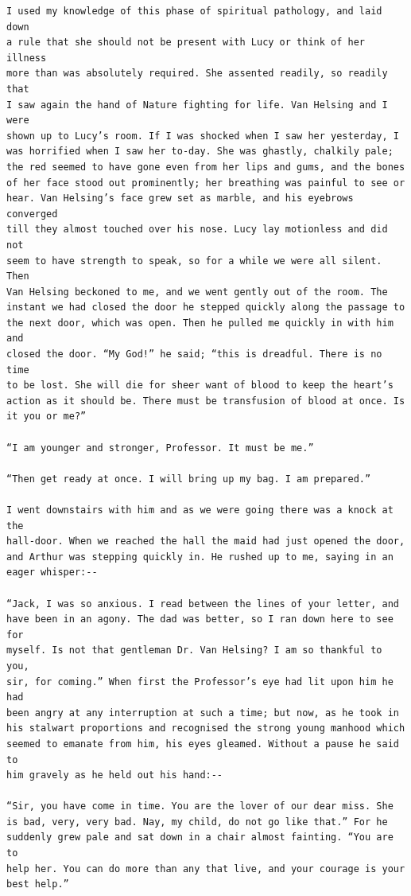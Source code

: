 \documentclass{article}
\begin{document}
\begin{verbatim}
I used my knowledge of this phase of spiritual pathology, and laid down
a rule that she should not be present with Lucy or think of her illness
more than was absolutely required. She assented readily, so readily that
I saw again the hand of Nature fighting for life. Van Helsing and I were
shown up to Lucy’s room. If I was shocked when I saw her yesterday, I
was horrified when I saw her to-day. She was ghastly, chalkily pale;
the red seemed to have gone even from her lips and gums, and the bones
of her face stood out prominently; her breathing was painful to see or
hear. Van Helsing’s face grew set as marble, and his eyebrows converged
till they almost touched over his nose. Lucy lay motionless and did not
seem to have strength to speak, so for a while we were all silent. Then
Van Helsing beckoned to me, and we went gently out of the room. The
instant we had closed the door he stepped quickly along the passage to
the next door, which was open. Then he pulled me quickly in with him and
closed the door. “My God!” he said; “this is dreadful. There is no time
to be lost. She will die for sheer want of blood to keep the heart’s
action as it should be. There must be transfusion of blood at once. Is
it you or me?”

“I am younger and stronger, Professor. It must be me.”

“Then get ready at once. I will bring up my bag. I am prepared.”

I went downstairs with him and as we were going there was a knock at the
hall-door. When we reached the hall the maid had just opened the door,
and Arthur was stepping quickly in. He rushed up to me, saying in an
eager whisper:--

“Jack, I was so anxious. I read between the lines of your letter, and
have been in an agony. The dad was better, so I ran down here to see for
myself. Is not that gentleman Dr. Van Helsing? I am so thankful to you,
sir, for coming.” When first the Professor’s eye had lit upon him he had
been angry at any interruption at such a time; but now, as he took in
his stalwart proportions and recognised the strong young manhood which
seemed to emanate from him, his eyes gleamed. Without a pause he said to
him gravely as he held out his hand:--

“Sir, you have come in time. You are the lover of our dear miss. She
is bad, very, very bad. Nay, my child, do not go like that.” For he
suddenly grew pale and sat down in a chair almost fainting. “You are to
help her. You can do more than any that live, and your courage is your
best help.”


\end{verbatim}
\end{document}

